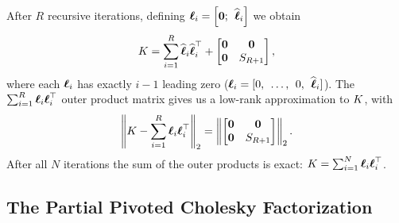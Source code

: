 %
After $R$ recursive iterations, defining $\boldsymbol{\ell}_{i} = \left[ \mathbf{0}; \:\: \widehat {\boldsymbol{\ell}}_i \right]$ we obtain
%
\begin{align}
  K  = \sum_{i=1}^{R} \widehat {\boldsymbol{\ell}}_{i} \widehat {\boldsymbol{\ell}}_{i}^{\top} + \begin{bmatrix} \mathbf{0} & \mathbf{0} \\ \mathbf{0} & S_{R+1} \end{bmatrix},
  \label{eqn:chol_low_rank}
\end{align}
%
where each $\boldsymbol{\ell}_i$ has exactly $i-1$ leading zero ($\boldsymbol{\ell}_i = [0, \:\: \ldots, \:\: 0, \:\: \widehat {\boldsymbol{\ell}}_i]$).
The $\sum_{i=1}^R \boldsymbol{\ell}_i \boldsymbol{\ell}_i^\top$ outer product matrix gives us a low-rank approximation to $K$, with
\begin{equation}
  \left\Vert K - \sum_{i=1}^{R}{\boldsymbol{\ell}}_{i}{\boldsymbol{\ell}}_{i}^{\top} \right\Vert_{2} = \left\Vert \begin{bmatrix} \mathbf{0} & \mathbf{0} \\ \mathbf{0} & S_{R+1} \end{bmatrix} \right\Vert_2.
\end{equation}
After all $N$ iterations the sum of the outer products is exact: $K = \sum_{i=1}^N \boldsymbol{\ell}_i \boldsymbol{\ell}_i^\top$.


\subsection{The Partial Pivoted Cholesky Factorization}
\label{sec:piv_chol}

